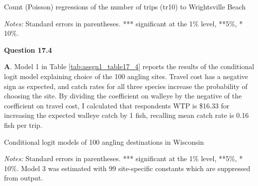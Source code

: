 \documentclass[12pt]{article}
\begin{document}
\singlespace
\begin{threeparttable}[h]  
\caption{Count (Poisson) regressions of the number of trips (tr10) to Wrightsville Beach}
{\label{tab:assgn1_tables17_3a}}
\small

\begin{tablenotes}
\footnotesize
\item \emph{Notes:} Standard errors in parentheses. *** significant at the 1\% level, **5\%, * 10\%.   \\
\end{tablenotes}
\end{threeparttable}
\doublespace

\textbf{Question 17.4}

\textbf{A}.   Model 1 in Table \ref{tab:assgn1_table17_4} reports the results of the conditional logit model explaining choice of the 100 angling sites.  Travel cost has a negative sign as expected, and catch rates for all three species increase the probability of choosing the site. By dividing the coefficient on walleye by the negative of the coefficient on travel cost, I calculated that respondents WTP is \$16.33 for increasing the expected walleye catch by 1 fish, recalling mean catch rate is 0.16 fish per trip.

\singlespace
\begin{threeparttable}[h]  
\caption{Conditional logit models of 100 angling destinations in Wisconsin}
{\label{tab:assgn1_table17_4}}
\small

\begin{tablenotes}
\footnotesize
\item \emph{Notes:} Standard errors in parentheses. *** significant at the 1\% level, **5\%, * 10\%.   Model 3 was estimated with 99 site-specific constants which are suppressed from output.\\
\end{tablenotes}
\end{threeparttable}
\doublespace
\end{document}
